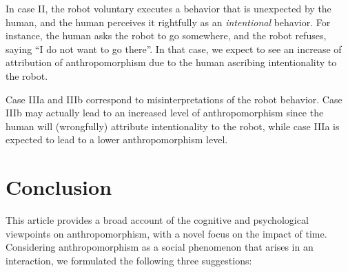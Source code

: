 \documentclass{frontiersSCNS} %
\begin{document}
In case II, the robot voluntary executes a behavior that is unexpected by the
human, and the human perceives it rightfully as an \emph{intentional} behavior.
For instance, the human asks the robot to go somewhere, and the robot refuses,
saying ``I do not want to go there''. In that case, we expect to see an increase
of attribution of anthropomorphism due to the human ascribing intentionality to
the robot.

Case IIIa and IIIb correspond to misinterpretations of the robot behavior. Case
IIIb may actually lead to an increased level of anthropomorphism since the human
will (wrongfully) attribute intentionality to the robot, while case IIIa is
expected to lead to a lower anthropomorphism level.

%
%
%
%
%
%

\section{Conclusion}
\label{sec:conclusion}

This article provides a broad account of the cognitive and
psychological viewpoints on anthropomorphism, with a novel focus on the
impact of time. Considering anthropomorphism as a social phenomenon that arises
in an interaction, we formulated the following three suggestions:
\end{document}

